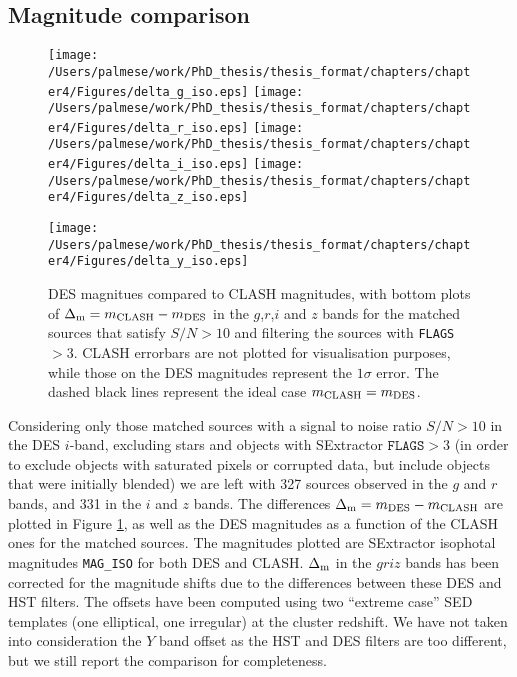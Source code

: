 {\subsection{Magnitude comparison}\label{magcomp}
\begin{figure}
\texttt{[image: /Users/palmese/work/PhD\_thesis/thesis\_format/chapters/chapter4/Figures/delta\_g\_iso.eps]}\hskip -1cm \texttt{[image: /Users/palmese/work/PhD\_thesis/thesis\_format/chapters/chapter4/Figures/delta\_r\_iso.eps]}
\texttt{[image: /Users/palmese/work/PhD\_thesis/thesis\_format/chapters/chapter4/Figures/delta\_i\_iso.eps]}\hskip -1cm \texttt{[image: /Users/palmese/work/PhD\_thesis/thesis\_format/chapters/chapter4/Figures/delta\_z\_iso.eps]}
\begin{center}
\texttt{[image: /Users/palmese/work/PhD\_thesis/thesis\_format/chapters/chapter4/Figures/delta\_y\_iso.eps]}\end{center}
\caption{ DES magnitues compared to CLASH magnitudes, with bottom plots of $\Delta_{\rm m} =  m_{\rm CLASH} - m_{\rm DES}$ in the $g$,$r$,$i$ and $z$ bands for the matched sources that satisfy $S/N>10$ and filtering the sources with \texttt{FLAGS}$> 3$. CLASH errorbars are not plotted for visualisation purposes, while those on the DES magnitudes represent the $1\sigma$ error. The dashed black lines represent the ideal case $m_{\rm CLASH} = m_{\rm DES}$. }\label{deltamag}
\end{figure}
Considering only those matched sources with a signal to noise ratio $S/N>10$ in the DES $i$-band, excluding stars and objects with SExtractor $\texttt{FLAGS} > 3$ (in order to exclude objects with saturated pixels or corrupted data, but include objects that were initially blended) we are left with 327 sources observed in the $g$ and $r$ bands, and 331 in the $i$ and $z$ bands. The differences $\Delta_{\rm m} =  m_{\rm DES}- m_{\rm CLASH}$ are plotted in Figure \ref{deltamag}, as well as the DES magnitudes as a function of the CLASH ones for the matched sources. The magnitudes plotted are SExtractor isophotal magnitudes \texttt{MAG\_ISO} for both DES and CLASH. $\Delta_{\rm m}$ in the $griz$ bands has been corrected for the magnitude shifts due to the differences between these DES and HST filters. The offsets have been computed using two ``extreme case'' SED templates (one elliptical, one irregular) at the cluster redshift. We have not taken into consideration the $Y$ band offset as the HST and DES filters are too different, but we still report the comparison for completeness.

}
